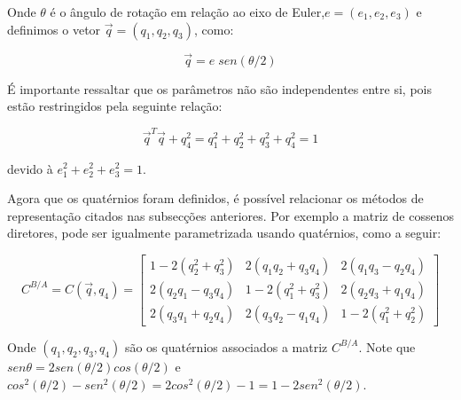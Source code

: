 Onde \begin{math}\theta\end{math} é o ângulo de rotação em relação ao eixo de Euler,\begin{math}e=(e_1,e_2,e_3)\end{math} e definimos o vetor \begin{math}\vec{q}=(q_1,q_2,q_3)\end{math}, como:

\begin{equation}\vec{q}=e\;sen(\theta/2)\end{equation}

É importante ressaltar que os parâmetros não são independentes entre si, pois estão restringidos pela seguinte relação:

\begin{equation}\vec{q}^T\vec{q}+q_4^2=q_1^2+q_2^2+q_3^2+q_4^2=1\end{equation}

devido à \begin{math}e_1^2+e_2^2+e_3^2=1\end{math}.

Agora que os quatérnios foram definidos, é possível relacionar os métodos de representação citados nas subsecções anteriores. Por exemplo a matriz de cossenos diretores, pode ser igualmente parametrizada usando quatérnios, como a seguir: 

\begin{equation}C^{B/A}=C(\vec{q},q_4)=\begin{bmatrix}
1-2(q_2^2+q_3^2) & 2(q_1q_2+q_3q_4) & 2(q_1q_3-q_2q_4) \\
2(q_2q_1-q_3q_4) & 1-2(q_1^2+q_3^2) & 2(q_2q_3+q_1q_4) \\
2(q_3q_1+q_2q_4) & 2(q_3q_2-q_1q_4) & 1-2(q_1^2+q_2^2)
\end{bmatrix}\end{equation}

Onde \begin{math}(q_1,q_2,q_3,q_4)\end{math} são os quatérnios associados a matriz \begin{math}C^{B/A}\end{math}. Note que \begin{math}sen\theta=2sen(\theta/2)cos(\theta/2)\end{math} e \begin{math}cos^2(\theta/2)-sen^2(\theta/2)=2cos^2(\theta/2)-1=1-2sen^2(\theta/2)\end{math}.

